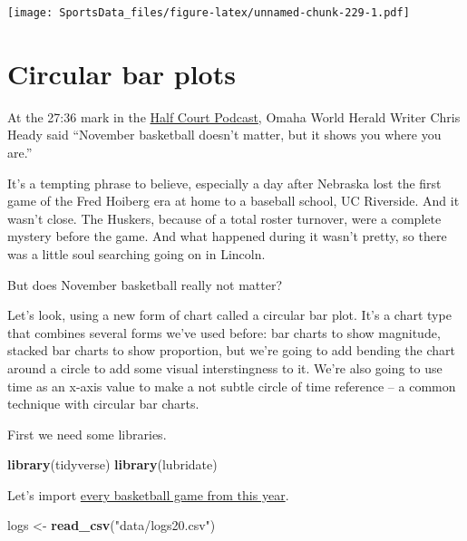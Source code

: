 \documentclass[
]{book}
\newenvironment{Shaded}{\begin{snugshade}}{\end{snugshade}}
\newcommand{\KeywordTok}[1]{\textcolor[rgb]{0.13,0.29,0.53}{\textbf{#1}}}
\newcommand{\NormalTok}[1]{#1}
\newcommand{\StringTok}[1]{\textcolor[rgb]{0.31,0.60,0.02}{#1}}
\begin{document}
\texttt{[image: SportsData\_files/figure-latex/unnamed-chunk-229-1.pdf]}

\hypertarget{circular-bar-plots}{%
\chapter{Circular bar plots}\label{circular-bar-plots}}

At the 27:36 mark in the \href{https://www.omaha.com/sports/podcasts/half-court-press/half-court-press-creighton-cruises-in-opener-nebraska-stunned-in/article_67081a35-3a8f-5e9e-ae67-e88fcacbb362.html}{Half Court Podcast}, Omaha World Herald Writer Chris Heady said ``November basketball doesn't matter, but it shows you where you are.''

It's a tempting phrase to believe, especially a day after Nebraska lost the first game of the Fred Hoiberg era at home to a baseball school, UC Riverside. And it wasn't close. The Huskers, because of a total roster turnover, were a complete mystery before the game. And what happened during it wasn't pretty, so there was a little soul searching going on in Lincoln.

But does November basketball really not matter?

Let's look, using a new form of chart called a circular bar plot. It's a chart type that combines several forms we've used before: bar charts to show magnitude, stacked bar charts to show proportion, but we're going to add bending the chart around a circle to add some visual interstingness to it. We're also going to use time as an x-axis value to make a not subtle circle of time reference -- a common technique with circular bar charts.

First we need some libraries.

\begin{Shaded}
\begin{Highlighting}[]
\KeywordTok{library}\NormalTok{(tidyverse)}
\KeywordTok{library}\NormalTok{(lubridate)}
\end{Highlighting}
\end{Shaded}

Let's import \href{https://unl.box.com/s/wnlh0u9low1yh56enion8zjmu8r7dc8p}{every basketball game from this year}.

\begin{Shaded}
\begin{Highlighting}[]
\NormalTok{logs <-}\StringTok{ }\KeywordTok{read_csv}\NormalTok{(}\StringTok{"data/logs20.csv"}\NormalTok{)}
\end{Highlighting}
\end{Shaded}
\end{document}
